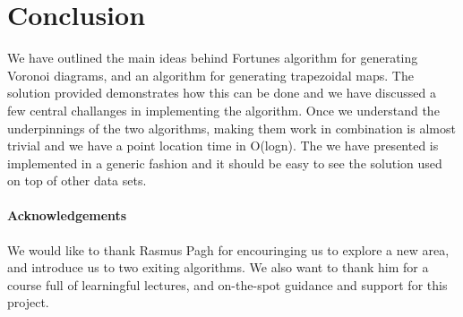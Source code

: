 \section{Conclusion}
We have outlined the main ideas behind Fortunes algorithm for generating Voronoi diagrams, and an algorithm for generating trapezoidal maps. The solution provided demonstrates how this can be done and we have discussed a few central challanges in implementing the algorithm. Once we understand the underpinnings of the two algorithms, making them work in combination is almost trivial and we have a point location time in O(logn). The we have presented is implemented in a generic fashion and it should be easy to see the solution used on top of other data sets.
\paragraph{Acknowledgements}
We would like to thank Rasmus Pagh for encouringing us to explore a new area, and introduce us to two exiting algorithms. We also want to thank him for a course full of learningful lectures, and on-the-spot guidance and support for this project.  